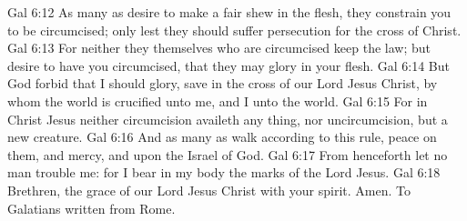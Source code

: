 \vs Gal 6:12 As many as desire to make a fair shew in the flesh, they constrain you to be circumcised; only lest they should suffer persecution for the cross of Christ.
\vs Gal 6:13 For neither they themselves who are circumcised keep the law; but desire to have you circumcised, that they may glory in your flesh.
\vs Gal 6:14 But God forbid that I should glory, save in the cross of our Lord Jesus Christ, by whom the world is crucified unto me, and I unto the world.
\vs Gal 6:15 For in Christ Jesus neither circumcision availeth any thing, nor uncircumcision, but a new creature.
\vs Gal 6:16 And as many as walk according to this rule, peace  on them, and mercy, and upon the Israel of God.
\vs Gal 6:17 From henceforth let no man trouble me: for I bear in my body the marks of the Lord Jesus.
\vs Gal 6:18 Brethren, the grace of our Lord Jesus Christ  with your spirit. Amen. To  Galatians written from Rome.
